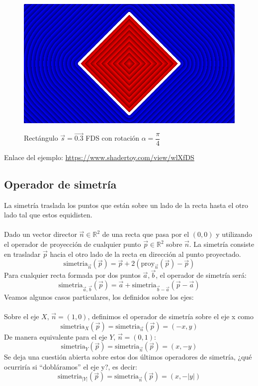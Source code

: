 \begin{figure}[H]
  \centering
  \captionsetup{justification=centering}%
  \includegraphics[width=1.0\textwidth]{secciones/imagenes/sdf/2d/sdf_rotacion.png}\label{fig:rotacion}
  \caption{Rectángulo \(\Vec{s}=\Vec{0.3}\) FDS con rotación \(\alpha=\dfrac{\pi}{4}\)}
\end{figure}

Enlace del ejemplo:
\url{https://www.shadertoy.com/view/wlXfDS}

\subsection{Operador de simetría}
La simetría traslada los puntos que están sobre un lado de la recta hasta el otro lado tal que estos equidisten.\\\\ Dado un vector director \(\Vec{n}\in\mathbb{R}^2\) de una recta que pasa por el \((0,0)\) y utilizando el operador de proyección de cualquier punto \(\Vec{p}\in\mathbb{R}^2\) sobre \(\Vec{n}\). La simetría consiste en trasladar \(\Vec{p}\) hacia el otro lado de la recta en dirección al punto proyectado.
\[\text{simetria}_{\Vec{n}}(\Vec{p})=\Vec{p} + 2(\text{proy}_{\Vec{n}}(\Vec{p})-\Vec{p})\]
Para cualquier recta formada por dos puntos \(\Vec{a}, \Vec{b}\), el operador de simetría será:
\[\text{simetria}_{\Vec{a},\Vec{b}}(\Vec{p}) =\Vec{a}+ \text{simetria}_{\Vec{b}-\Vec{a}}(\Vec{p}-\Vec{a})\]
Veamos algunos casos particulares, los definidos sobre los ejes:\\\\
Sobre el eje \(X\), \(\Vec{n}=(1,0)\), definimos el operador de simetría sobre el eje x como
\[\text{simetria}_{X}(\Vec{p})=\text{simetria}_{\Vec{n}}(\Vec{p})=(-x, y)\]
De manera equivalente para el eje \(Y\), \(\Vec{n}=(0,1)\):
\[\text{simetria}_{Y}(\Vec{p})=\text{simetria}_{\Vec{n}}(\Vec{p})=(x, -y)\]
Se deja una cuestión abierta sobre estos dos últimos operadores de simetría, ¿qué ocurriría si \enquote{dobláramos} el eje y?, es decir:
\[\text{simetria}_{\vert Y\vert}(\Vec{p})=\text{simetria}_{\Vec{n}}(\Vec{p})=(x, -\vert y\vert)\]


